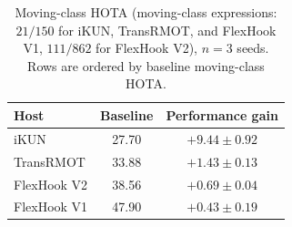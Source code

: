 \documentclass{article}
\providecommand{\DIFadd}[1]{{\protect\color{blue}\uwave{#1}}} %
\providecommand{\DIFaddbegin}{} %
\providecommand{\DIFaddend}{} %
\providecommand{\DIFdelbegin}{} %
\providecommand{\DIFaddFL}[1]{\DIFadd{#1}} %
\providecommand{\DIFscaledelfig}{0.5}
\newlength{\DIFdelgraphicswidth} %
\newlength{\DIFdelgraphicsheight} %
\providecommand{\DIFaddincludegraphics}[2][]{{\color{blue}\fbox{\DIFOincludegraphics[#1]{#2}}}} %
\providecommand{\DIFdelincludegraphics}[2][]{%
\sbox{\DIFdelgraphicsbox}{\DIFOincludegraphics[#1]{#2}}%
\settoboxwidth{\DIFdelgraphicswidth}{\DIFdelgraphicsbox} %
\settoboxtotalheight{\DIFdelgraphicsheight}{\DIFdelgraphicsbox} %
\scalebox{\DIFscaledelfig}{%
\parbox[b]{\DIFdelgraphicswidth}{\usebox{\DIFdelgraphicsbox}\\[-\baselineskip] \rule{\DIFdelgraphicswidth}{0em}}\llap{\resizebox{\DIFdelgraphicswidth}{\DIFdelgraphicsheight}{%
\setlength{\unitlength}{\DIFdelgraphicswidth}%
\begin{picture}(1,1)%
\thicklines\linethickness{2pt} %
{\color[rgb]{1,0,0}\put(0,0){\framebox(1,1){}}}%
{\color[rgb]{1,0,0}\put(0,0){\line( 1,1){1}}}%
{\color[rgb]{1,0,0}\put(0,1){\line(1,-1){1}}}%
\end{picture}%
}\hspace*{3pt}}} %
} %
\DeclareRobustCommand{\DIFaddbegin}{\DIFOaddbegin \let\includegraphics\DIFaddincludegraphics} %
\DeclareRobustCommand{\DIFaddend}{\DIFOaddend \let\includegraphics\DIFOincludegraphics} %
\DeclareRobustCommand{\DIFdelbegin}{\DIFOdelbegin \let\includegraphics\DIFdelincludegraphics} %
\begin{document}
\DIFaddbegin \begin{table}[t]
  \centering
  \caption{\DIFaddFL{[changed] }Moving-class HOTA (moving-class expressions: $21/150$ for iKUN, TransRMOT, and FlexHook V1, $111/862$ for FlexHook V2), $n{=}3$ seeds. Rows are ordered by baseline moving-class HOTA.}
  \label{tab:deficit}
  \small
  \setlength{\tabcolsep}{2pt}
  \begin{tabular*}{\linewidth}{@{\extracolsep{\fill}}lcc}
    \hline
    Host        & Baseline & Performance gain \\
    \hline
    iKUN        & 27.70    & $+9.44\pm0.92$   \\
    TransRMOT   & 33.88    & $+1.43\pm0.13$   \\
    FlexHook V2 & 38.56    & $+0.69\pm0.04$   \\
    FlexHook V1 & 47.90    & $+0.43\pm0.19$   \\
    \hline
  \end{tabular*}
\end{table}
\DIFaddend 

\DIFdelbegin %

\end{document}
